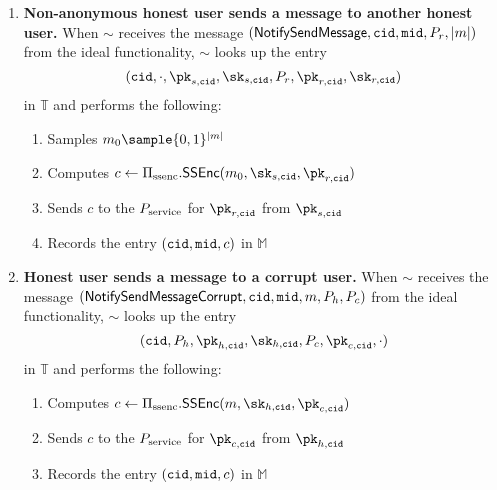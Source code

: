 \begin{enumerate}
	\item \textbf{Non-anonymous honest user sends a message to another honest user.} When $\sim$ receives the message $(\mathsf{NotifySendMessage}, \mathtt{cid}, \mathtt{mid}, P_r, | m |)$ from the ideal functionality, $\sim$ looks up the entry $$(\convoid, \cdot, \pk_{s,\convoid}, \sk_{s,\convoid}, P_r, \pk_{r,\convoid}, \sk_{r,\convoid})$$ in $\mathbb{T}$ and performs the following:
	\begin{enumerate}
		\item Samples $m_0 \sample \{0,1\}^{|m|}$
		\item Computes $c \leftarrow \sealedsenderencryptionscheme.\sealedsenderencryptionenc(m_0, \sk_{s,\convoid}, \pk_{r,\convoid})$ 
		\item Sends $c$ to the $P_{\text{service}}$ for $\pk_{r,\convoid}$ from $\pk_{s,\convoid}$
		\item Records the entry $(\mathtt{cid}, \mathtt{mid}, c)$ in $\mathbb{M}$
	\end{enumerate}


	\item \textbf{Honest user sends a message to a corrupt user.} When $\sim$ receives the message $(\mathsf{NotifySendMessageCorrupt}, \mathtt{cid}, \mathtt{mid}, m, P_h, P_c)$ from the ideal functionality, $\sim$ looks up the entry 
	$$(\convoid, P_h, \pk_{h,\convoid}, \sk_{h,\convoid}, P_c, \pk_{c,\convoid}, \cdot)$$ in $\mathbb{T}$ and performs the following:
	\begin{enumerate}
		\item Computes $c \leftarrow \sealedsenderencryptionscheme.\sealedsenderencryptionenc(m, \sk_{h,\convoid}, \pk_{c,\convoid})$ 
		\item Sends $c$ to the $P_{\text{service}}$ for $\pk_{c,\convoid}$ from $\pk_{h,\convoid}$
		\item Records the entry $(\mathtt{cid}, \mathtt{mid}, c)$ in $\mathbb{M}$

	\end{enumerate}


\end{enumerate}
